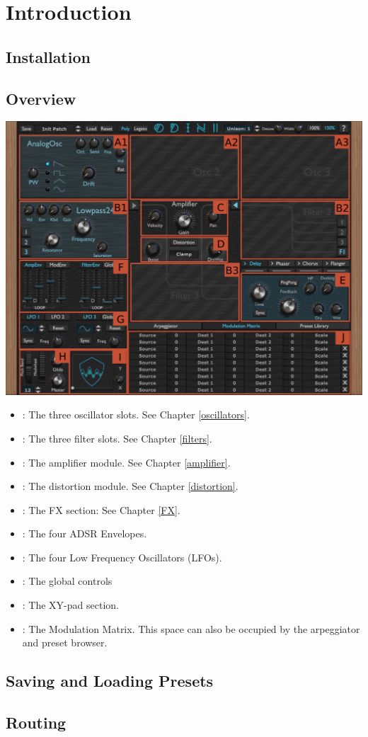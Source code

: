 \chapter{Introduction}
\section{Installation}
\clearpage
\section{Overview}
\begin{center}
    \includegraphics[width=\textwidth]{graphics/overview.png}
\end{center}

\begin{itemize}
    \item {}: The three oscillator slots. See Chapter \ref{oscillators}.
    \item {}: The three filter slots. See Chapter \ref{filters}.
    \item {}: The amplifier module. See Chapter \ref{amplifier}.
    \item {}: The distortion module. See Chapter \ref{distortion}.
    \item {}: The FX section: See Chapter \ref{FX}.
    \item {}: The four ADSR Envelopes.
    \item {}: The four Low Frequency Oscillators (LFOs).
    \item {}: The global controls
    \item {}: The XY-pad section.
    \item {}: The Modulation Matrix. This space can also be occupied by the arpeggiator and preset browser.
\end{itemize}
\section{Saving and Loading Presets}
\section{Routing}
\label{routing}
